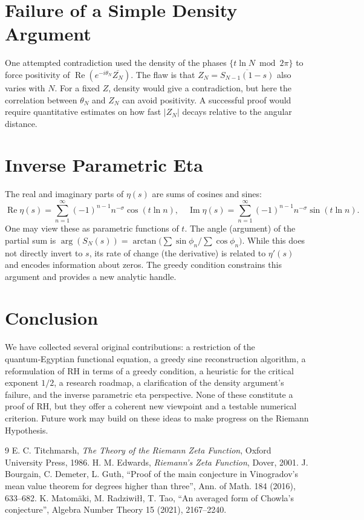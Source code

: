 \documentclass[12pt,a4paper]{article}
\begin{document}
\section{Failure of a Simple Density Argument}

One attempted contradiction used the density of the phases $\{t\ln N\bmod2\pi\}$ to force positivity of $\operatorname{Re}(e^{-i\theta_N}\overline{Z_N})$. The flaw is that $Z_N = \overline{S_{N-1}(1-s)}$ also varies with $N$. For a fixed $Z$, density would give a contradiction, but here the correlation between $\theta_N$ and $Z_N$ can avoid positivity. A successful proof would require quantitative estimates on how fast $|Z_N|$ decays relative to the angular distance.

\section{Inverse Parametric Eta}

The real and imaginary parts of $\eta(s)$ are sums of cosines and sines:
\[
\operatorname{Re}\eta(s)=\sum_{n=1}^\infty (-1)^{n-1}n^{-\sigma}\cos(t\ln n),\quad
\operatorname{Im}\eta(s)=\sum_{n=1}^\infty (-1)^{n-1}n^{-\sigma}\sin(t\ln n).
\]
One may view these as parametric functions of $t$. The angle (argument) of the partial sum is $\arg(S_N(s))=\arctan\bigl(\sum\sin\phi_n/\sum\cos\phi_n\bigr)$. While this does not directly invert to $s$, its rate of change (the derivative) is related to $\eta'(s)$ and encodes information about zeros. The greedy condition constrains this argument and provides a new analytic handle.

\section{Conclusion}

We have collected several original contributions: a restriction of the quantum‑Egyptian functional equation, a greedy sine reconstruction algorithm, a reformulation of RH in terms of a greedy condition, a heuristic for the critical exponent $1/2$, a research roadmap, a clarification of the density argument's failure, and the inverse parametric eta perspective. None of these constitute a proof of RH, but they offer a coherent new viewpoint and a testable numerical criterion. Future work may build on these ideas to make progress on the Riemann Hypothesis.

\begin{thebibliography}{9}
 E. C. Titchmarsh, \textit{The Theory of the Riemann Zeta Function}, Oxford University Press, 1986.
 H. M. Edwards, \textit{Riemann's Zeta Function}, Dover, 2001.
 J. Bourgain, C. Demeter, L. Guth, ``Proof of the main conjecture in Vinogradov's mean value theorem for degrees higher than three'', Ann. of Math. 184 (2016), 633–682.
 K. Matomäki, M. Radziwiłł, T. Tao, ``An averaged form of Chowla's conjecture'', Algebra Number Theory 15 (2021), 2167–2240.
\end{thebibliography}
\end{document}
